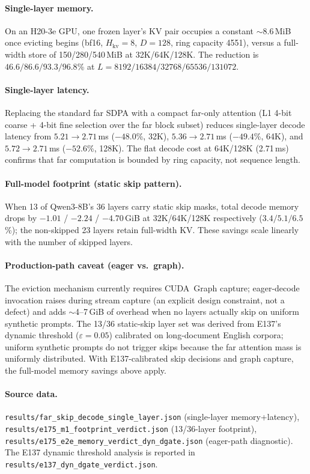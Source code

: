 \documentclass[10pt,letterpaper]{article}
\begin{document}
\paragraph{Single-layer memory.}  On an H20-3e GPU, one frozen layer's KV pair occupies a constant $\sim$8.6\,MiB once evicting begins (bf16, $H_\mathrm{kv}{=}8$, $D{=}128$, ring capacity 4551), versus a full-width store of 150/280/540\,MiB at 32K/64K/128K.  The reduction is $46.6 / 86.6 / 93.3 / 96.8$\% at $L = 8192 / 16384 / 32768 / 65536 / 131072$.

\paragraph{Single-layer latency.} Replacing the standard far SDPA with a compact far-only attention (L1 4-bit coarse + 4-bit fine selection over the far block subset) reduces single-layer decode latency from $5.21\!\rightarrow\!2.71$\,ms ($-48.0$\%, 32K), $5.36\!\rightarrow\!2.71$\,ms ($-49.4$\%, 64K), and $5.72\!\rightarrow\!2.71$\,ms ($-52.6$\%, 128K).  The flat decode cost at 64K/128K (2.71\,ms) confirms that far computation is bounded by ring capacity, not sequence length.

\paragraph{Full-model footprint (static skip pattern).} When 13 of Qwen3-8B's 36 layers carry static skip masks, total decode memory drops by $-1.01$ / $-2.24$ / $-4.70$\,GiB at 32K/64K/128K respectively ($3.4 / 5.1 / 6.5$\%); the non-skipped 23 layers retain full-width KV.  These savings scale linearly with the number of skipped layers.

\paragraph{Production-path caveat (eager vs.\ graph).} The eviction mechanism currently requires CUDA~Graph capture; eager-decode invocation raises during stream capture (an explicit design constraint, not a defect) and adds $\sim$4--7\,GiB of overhead when no layers actually skip on uniform synthetic prompts.  The 13/36 static-skip layer set was derived from E137's dynamic threshold ($\varepsilon{=}0.05$) calibrated on long-document English corpora; uniform synthetic prompts do not trigger skips because the far attention mass is uniformly distributed.  With E137-calibrated skip decisions and graph capture, the full-model memory savings above apply.

\paragraph{Source data.} \texttt{results/far\_skip\_decode\_single\_layer.json} (single-layer memory+latency), \texttt{results/e175\_m1\_footprint\_verdict.json} (13/36-layer footprint), \texttt{results/e175\_e2e\_memory\_verdict\_dyn\_dgate.json} (eager-path diagnostic).  The E137 dynamic threshold analysis is reported in \texttt{results/e137\_dyn\_dgate\_verdict.json}.
\end{document}
